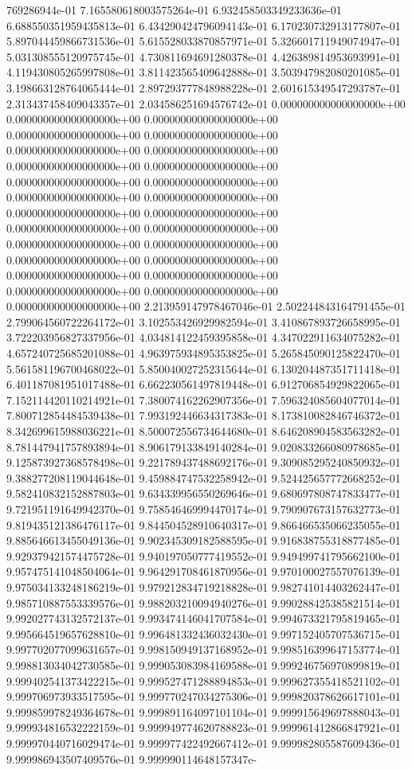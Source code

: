 769286944e-01	7.165580618003575264e-01	6.932458503349233636e-01	6.688550351959435813e-01	6.434290424796094143e-01	6.170230732913177807e-01	5.897044459866731536e-01	5.615528033870857971e-01	5.326601711949074947e-01	5.031308555120975745e-01	4.730811694691280378e-01	4.426389814953693991e-01	4.119430805265997808e-01	3.811423565409642888e-01	3.503947982080201085e-01	3.198663128764065444e-01	2.897293777848988228e-01	2.601615349547293787e-01	2.313437458409043357e-01	2.034586251694576742e-01	0.000000000000000000e+00	0.000000000000000000e+00	0.000000000000000000e+00	0.000000000000000000e+00	0.000000000000000000e+00	0.000000000000000000e+00	0.000000000000000000e+00	0.000000000000000000e+00	0.000000000000000000e+00	0.000000000000000000e+00	0.000000000000000000e+00	0.000000000000000000e+00	0.000000000000000000e+00	0.000000000000000000e+00	0.000000000000000000e+00	0.000000000000000000e+00	0.000000000000000000e+00	0.000000000000000000e+00	0.000000000000000000e+00	0.000000000000000000e+00	0.000000000000000000e+00	0.000000000000000000e+00	0.000000000000000000e+00	0.000000000000000000e+00	0.000000000000000000e+00	0.000000000000000000e+00	2.213959147978467046e-01	2.502244843164791455e-01	2.799064560722264172e-01	3.102553426929982594e-01	3.410867893726658995e-01	3.722203956827337956e-01	4.034814122459395858e-01	4.347022911634075282e-01	4.657240725685201088e-01	4.963975934895353825e-01	5.265845090125822470e-01	5.561581196700468022e-01	5.850040027252315644e-01	6.130204487351711418e-01	6.401187081951017488e-01	6.662230561497819448e-01	6.912706854929822065e-01	7.152114420110214921e-01	7.380074162262907356e-01	7.596324085604077014e-01	7.800712854484539438e-01	7.993192446634317383e-01	8.173810082846746372e-01	8.342699615988036221e-01	8.500072556734644680e-01	8.646208904583563282e-01	8.781447941757893894e-01	8.906179133849140284e-01	9.020833266080978685e-01	9.125873927368578498e-01	9.221789437488692176e-01	9.309085295240850932e-01	9.388277208119044648e-01	9.459884747532258942e-01	9.524425657772668252e-01	9.582410832152887803e-01	9.634339956550269646e-01	9.680697808747833477e-01	9.721951191649942370e-01	9.758546469994470174e-01	9.790907673157632773e-01	9.819435121386476117e-01	9.844504528910640317e-01	9.866466535066235055e-01	9.885646613455049136e-01	9.902345309182588595e-01	9.916838755318877485e-01	9.929379421574475728e-01	9.940197050777419552e-01	9.949499741795662100e-01	9.957475141048504064e-01	9.964291708461870956e-01	9.970100027557076139e-01	9.975034133248186219e-01	9.979212834719218828e-01	9.982741014403262447e-01	9.985710887553339576e-01	9.988203210094940276e-01	9.990288425385821514e-01	9.992027743132572137e-01	9.993474146041707584e-01	9.994673321795819465e-01	9.995664519657628810e-01	9.996481332436032430e-01	9.997152405707536715e-01	9.997702077099631657e-01	9.998150949137168952e-01	9.998516399647153774e-01	9.998813034042730585e-01	9.999053083984169588e-01	9.999246756970899819e-01	9.999402541373422215e-01	9.999527471288894853e-01	9.999627355418521102e-01	9.999706973933517595e-01	9.999770247034275306e-01	9.999820378626617101e-01	9.999859978249364678e-01	9.999891164097101104e-01	9.999915649697888043e-01	9.999934816532222159e-01	9.999949774620788823e-01	9.999961412866847921e-01	9.999970440716029474e-01	9.999977422492667412e-01	9.999982805587609436e-01	9.999986943507409576e-01	9.999990114648157347e-